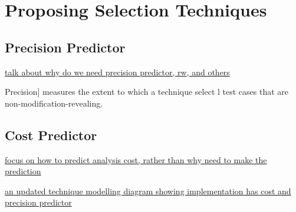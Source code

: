 %
%


\reversemarginpar
\setlength{\marginparwidth}{2cm}
\chapter{Proposing Selection Techniques}
\label{chap:Proposing Selection Techniques}
\section{Precision Predictor}\label{sec:Precision Predictor}
\underline{talk about why do we need precision predictor, rw, and others}

Precision] measures the extent to which a technique select
l  test cases that are non-modification-revealing.

\section{Cost Predictor}
\label{sec:Cost Predictor}
\underline{focus on how to predict analysis cost, rather than why need to make
the prediction}

\underline{an updated technique modelling diagram showing implementation has
cost and precision predictor}
